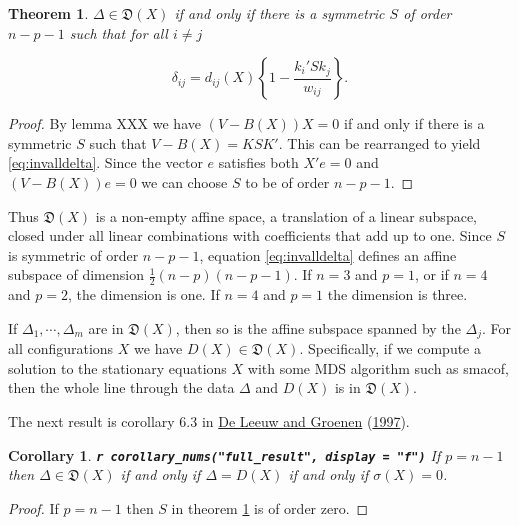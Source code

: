 \documentclass[
  12pt,
]{book}
\newtheorem{theorem}{Theorem}[chapter]
\newtheorem{corollary}{Corollary}[chapter]
\theoremstyle{definition}
\theoremstyle{definition}
\theoremstyle{definition}
\theoremstyle{definition}
\theoremstyle{remark}
\begin{document}
\begin{theorem}
\protect\hypertarget{thm:keyresult}{}\label{thm:keyresult}\(\Delta\in\mathfrak{D}(X)\) if and only if there is a symmetric \(S\) of order \(n-p-1\) such that for all \(i\not= j\)

\begin{equation}
\delta_{ij}=d_{ij}(X)\left\{1-\frac{k_i'Sk_j^{\ }}{w_{ij}}\right\}.
\label{eq:invalldelta}
\end{equation}
\end{theorem}

\begin{proof}
By lemma XXX we have \((V-B(X))X=0\) if and only if there is a symmetric \(S\) such that \(V-B(X)=KSK'\). This can be rearranged to yield \eqref{eq:invalldelta}. Since the vector \(e\) satisfies both \(X'e=0\) and \((V-B(X))e=0\) we can choose \(S\) to be of order \(n-p-1\).
\end{proof}

Thus \(\mathfrak{D}(X)\) is a non-empty affine space, a translation of a linear subspace, closed under all linear combinations with coefficients that add up to one. Since \(S\) is symmetric of order \(n-p-1\), equation \eqref{eq:invalldelta} defines an affine subspace of dimension \(\frac12(n-p)(n-p-1)\). If \(n=3\) and \(p=1\), or if \(n=4\) and \(p=2\), the dimension is one. If \(n=4\) and \(p=1\) the dimension is three.

If \(\Delta_1,\cdots,\Delta_m\) are in \(\mathfrak{D}(X)\), then so is the affine subspace spanned by the \(\Delta_j\). For all configurations \(X\) we have \(D(X)\in\mathfrak{D}(X)\). Specifically, if we compute a solution to the stationary equations \(X\) with some MDS algorithm such as smacof, then the whole line through the data \(\Delta\) and \(D(X)\) is in \(\mathfrak{D}(X)\).

The next result is corollary 6.3 in \protect\hyperlink{ref-deleeuw_groenen_A_97}{De Leeuw and Groenen} (\protect\hyperlink{ref-deleeuw_groenen_A_97}{1997}).

\begin{corollary}
\protect\hypertarget{cor:unnamed-chunk-10}{}{\label{cor:unnamed-chunk-10} }\textbf{\texttt{r\ corollary\_nums("full\_result",\ display\ =\ "f")}} If \(p=n-1\) then \(\Delta\in\mathfrak{D}(X)\) if and only if \(\Delta=D(X)\) if and only if \(\sigma(X)=0\).
\end{corollary}

\begin{proof}
If \(p=n-1\) then \(S\) in theorem \ref{thm:keyresult} is of order zero.
\end{proof}
\end{document}
